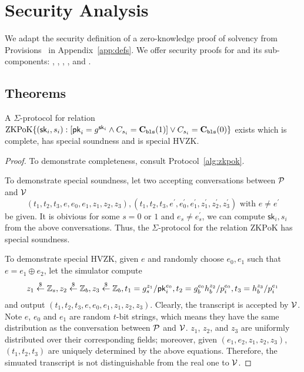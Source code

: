 \chapter{Security Analysis}
\label{sec:proof}

We adapt the security definition of a zero-knowledge proof of solvency from Provisions~\cite{provisions} in Appendix~\ref{app:defs}. We offer security proofs for \Sys and its sub-components: \bootstrap, \userproof, \pol, \poa, and \pos.

\section{Theorems}


\begin{theorem}
\label{thm:sigmaclaim}
A $\Sigma$-protocol for relation $\mathrm{ZKPoK}\{(\mathsf{sk}_i,s_i):[\mathsf{pk}_i=g^{\mathsf{sk}_i}\land{C_{s_i}}=\textbf{C}_\texttt{bls}(1)] \lor{C_{s_i}}=\textbf{C}_\texttt{bls}(0)\}$ exists which is complete, has special soundness and is special HVZK. 
\end{theorem}

\begin{proof}
To demonstrate completeness, consult Protocol~\ref{alg:zkpok}.

To demonstrate special soundness, let two accepting conversations between $\mathcal{P}$ and $\mathcal{V}$
$$
(t_1,t_2,t_3,e,e_0,e_1,z_1,z_2,z_3),(t_1,t_2,t_3,e^\prime,e_0^\prime,e_1^\prime,z_1^\prime,z_2^\prime,z_3^\prime)\text{ with $e\ne{e^\prime}$}
$$
be given. It is obivious for some $s=0$ or $1$ and $e_s\ne{e_s^\prime}$, we can compute $\mathsf{sk}_i,s_i$ from the above conversations. Thus, the $\Sigma$-protocol for the relation $\mathrm{ZKPoK}$ has special soundness.

To demonstrate special HVZK, given $e$ and randomly choose $e_0,e_1$ such that $e=e_1\oplus{e_2}$, let the simulator compute
$$
z_1\stackrel{\$}{\leftarrow}\mathbb{Z}_s,z_2\stackrel{\$}{\leftarrow}\mathbb{Z}_b,z_3\stackrel{\$}{\leftarrow}\mathbb{Z}_b,t_1=g_s^{z_1}/\mathsf{pk}_i^{e_0},t_2=g_b^{e_0}h_b^{z_2}/{p_i^{e_0}},t_3=h_b^{z_3}/{p_i^{e_1}}
$$
and output $(t_1,t_2,t_3,e,e_0,e_1,z_1,z_2,z_3)$. Clearly, the transcript is accepted by $\mathcal{V}$. Note $e$, $e_0$ and $e_1$ are random $t$-bit strings, which means they have the same distribution as the conversation between $\mathcal{P}$ and $\mathcal{V}$. $z_1$, $z_2$, and $z_3$ are uniformly distributed over their corresponding fields; moreover, given $(e_1,e_2,z_1,z_2,z_3)$, $(t_1,t_2,t_3)$ are uniquely determined by the above equations. Therefore, the simuated transcript is not distinguishable from the real one to $\mathcal{V}$.
\end{proof}


